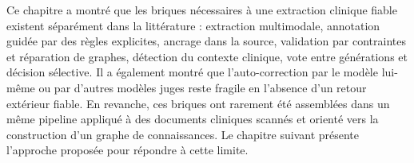 Ce chapitre a montré que les briques nécessaires à une extraction clinique fiable existent séparément dans la littérature : extraction multimodale, annotation guidée par des règles explicites, ancrage dans la source, validation par contraintes et réparation de graphes, détection du contexte clinique, vote entre générations et décision sélective. Il a également montré que l'auto-correction par le modèle lui-même ou par d'autres modèles juges reste fragile en l'absence d'un retour extérieur fiable. En revanche, ces briques ont rarement été assemblées dans un même pipeline appliqué à des documents cliniques scannés et orienté vers la construction d'un graphe de connaissances. Le chapitre suivant présente l'approche proposée pour répondre à cette limite.
